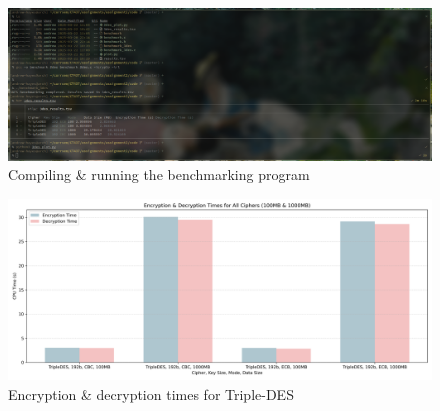 \documentclass[a4paper]{article}
\begin{document}
\begin{figure}[H]
    \centering
    \includegraphics[width=\textwidth]{./images/3desss.png}
    \caption{Compiling \& running the benchmarking program}
\end{figure}

\begin{figure}[H]
    \centering
    \includegraphics[width=\textwidth]{./images/3des.png}
    \caption{Encryption \& decryption times for Triple-DES}
\end{figure}
\end{document}
